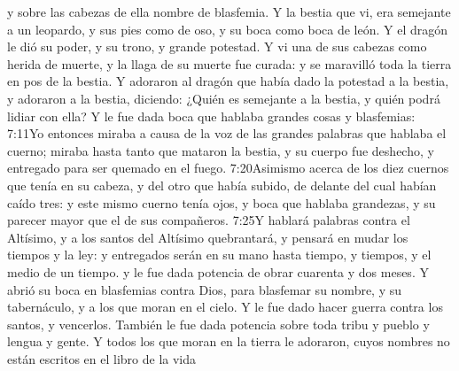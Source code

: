  y sobre las cabezas de ella nombre de blasfemia.
Y la bestia que vi, era semejante a un leopardo, y sus pies como de oso, y su boca como boca de león. Y el dragón le dió su poder, y su trono, y grande potestad. 
Y vi una de sus cabezas como herida de muerte, y la llaga de su muerte fue curada: y se maravilló toda la tierra en pos de la bestia. 
Y adoraron al dragón que había dado la potestad a la bestia, y adoraron a la bestia, diciendo: ¿Quién es semejante a la bestia,
 y quién podrá lidiar con ella? 
Y le fue dada boca que hablaba grandes cosas y blasfemias:%
				       {7:11}{Yo entonces miraba a causa de la voz de las grandes palabras que hablaba el cuerno; miraba hasta tanto que mataron la bestia, y su cuerpo fue deshecho, y entregado para ser quemado en el fuego.}%
					   {7:20}{Asimismo acerca de los diez cuernos que tenía en su cabeza, y del otro que había subido, de delante del cual habían caído tres: y este mismo cuerno tenía ojos, y boca que hablaba grandezas, y su parecer mayor que el de sus compañeros.}
					   {7:25}{Y hablará palabras contra el Altísimo, y a los santos del Altísimo quebrantará, y pensará en mudar los tiempos y la ley: y entregados serán en su mano hasta tiempo, y tiempos, y el medio de un tiempo.}
 y le fue dada potencia de obrar cuarenta y dos meses. 
Y abrió su boca en blasfemias contra Dios, para blasfemar su nombre, y su tabernáculo, y a los que moran en el cielo.%
Y le fue dado hacer guerra contra los santos, y vencerlos. También le fue dada potencia sobre toda tribu y pueblo y lengua y gente. 
Y todos los que moran en la tierra le adoraron, cuyos nombres no están escritos en el libro de la vida%

